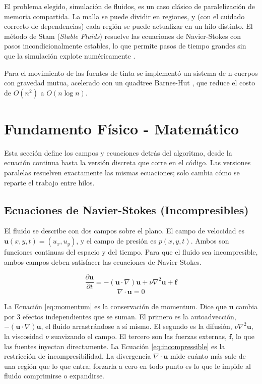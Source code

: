 \documentclass[11pt]{article}
\begin{document}
El problema elegido, simulación de fluidos, es un caso clásico de
paralelización de memoria compartida. La malla se puede dividir en
regiones, y (con el cuidado correcto de dependencias) cada región se puede
actualizar en un hilo distinto. El método de Stam (\emph{Stable Fluids})
resuelve las ecuaciones de Navier-Stokes con pasos incondicionalmente
estables, lo que permite pasos de tiempo grandes sin que la simulación
explote numéricamente \cite{stam1999}.

Para el movimiento de las fuentes de tinta se implementó un sistema de
n-cuerpos con gravedad mutua, acelerado con un quadtree Barnes-Hut
\cite{barneshut1986}, que reduce el costo de $O(n^2)$ a $O(n \log n)$.

\newpage

\section{Fundamento Físico - Matemático}\label{sec:matematica}

Esta sección define los campos y ecuaciones detrás del algoritmo, 
 desde la ecuación continua hasta la versión discreta que
corre en el código. Las versiones paralelas resuelven exactamente las
mismas ecuaciones; solo cambia cómo se reparte el trabajo entre hilos.

\subsection{Ecuaciones de Navier-Stokes (Incompresibles)}

El fluido se describe con dos campos sobre el plano. El campo de
velocidad es $\mathbf{u}(x, y, t) = (u_x, u_y)$, y el campo de presión es
$p(x, y, t)$. Ambos son funciones continuas del espacio y del tiempo.
Para que el fluido sea incompresible, ambos campos deben satisfacer las
ecuaciones de Navier-Stokes.

\begin{equation}
\frac{\partial \mathbf{u}}{\partial t} = -(\mathbf{u} \cdot \nabla)\mathbf{u} + \nu \nabla^2 \mathbf{u} + \mathbf{f}
\label{eq:momentum}
\end{equation}
\begin{equation}
\nabla \cdot \mathbf{u} = 0
\label{eq:incompressible}
\end{equation}

La Ecuación \ref{eq:momentum} es la conservación de momentum. Dice que
$\mathbf{u}$ cambia por 3 efectos independientes que se suman. El primero
es la autoadvección, $-(\mathbf{u} \cdot \nabla)\mathbf{u}$, el fluido
arrastrándose a sí mismo. El segundo es la difusión, $\nu \nabla^2
\mathbf{u}$, la viscosidad $\nu$ suavizando el campo. El tercero son las
fuerzas externas, $\mathbf{f}$, lo que las fuentes inyectan directamente.
La Ecuación \ref{eq:incompressible} es la restricción de
incompresibilidad. La divergencia $\nabla \cdot \mathbf{u}$ mide cuánto
más sale de una región que lo que entra; forzarla a cero en todo punto
es lo que le impide al fluido comprimirse o expandirse.
\end{document}
